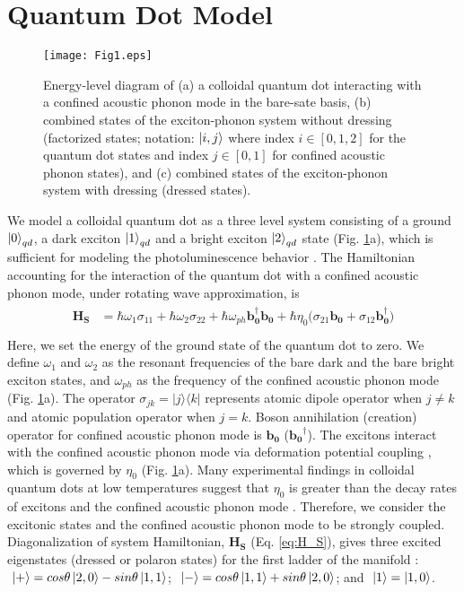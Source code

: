 \documentclass[aps,pra,preprint,groupedaddress]{revtex4-1}
\begin{document}
\section*{Quantum Dot Model}
\begin{figure}[htbp]
\centering\texttt{[image: Fig1.eps]}
\caption{Energy-level diagram of (a) a colloidal quantum dot interacting with a confined acoustic phonon mode in the bare-sate basis, (b) combined states of the exciton-phonon system without dressing (factorized states; notation: $\ket{i,j}$ where index $i \in [0,1,2]$ for the quantum dot states and index $j \in [0,1]$ for confined acoustic phonon states), and (c) combined states of the exciton-phonon system with dressing (dressed states).}
\label{Fig:BareQD_schematic}
\end{figure}
We model a colloidal quantum dot as a three level system consisting of a ground $\ket{0}_{qd}$, a dark exciton $\ket{1}_{qd}$ and a bright exciton $\ket{2}_{qd}$ state (Fig. \ref{Fig:BareQD_schematic}a), which is sufficient for modeling the photoluminescence behavior \cite{Klimov2007b}. The Hamiltonian accounting for the interaction of the quantum dot with a confined acoustic phonon mode, under rotating wave approximation, is
\begin{eqnarray}
\begin{aligned}
\label{eq:H_S}
\mathbf{H_{S}} &= \hbar\omega_{1}\sigma_{11}+ \hbar\omega_{2}\sigma_{22}+\hbar\omega_{ph}\mathbf{b_{0}^\dagger}\mathbf{b_{0}}+\hbar\eta_0(\sigma_{21}\mathbf{b_{0}}+\sigma_{12}\mathbf{b_{0}^\dagger)}\\
\end{aligned}
\end{eqnarray}
Here, we set the energy of the ground state of the quantum dot to zero. We define $\omega_{1}$ and $\omega_{2}$ as the resonant frequencies of the bare dark and the bare bright exciton states, and $\omega_{ph}$ as the frequency of the confined acoustic phonon mode (Fig. \ref{Fig:BareQD_schematic}a). The operator $\sigma_{jk} = |j\rangle\langle k|$ represents atomic dipole operator when $j \neq k$ and atomic population operator when $j = k$. Boson annihilation (creation) operator for confined acoustic phonon mode is $\mathbf{b_0}$ ($\mathbf{b_0}^\dagger$). The excitons interact with the confined acoustic phonon mode via deformation potential coupling \cite{Takagahara1996}, which is governed by $\eta_0$ (Fig. \ref{Fig:BareQD_schematic}a). Many experimental findings in colloidal quantum dots at low temperatures suggest that $\eta_0$ is greater than the decay rates of excitons and the confined acoustic phonon mode \cite{Krauss1997,Oron2009, Sagar2008, Califano2005, Labeau2003,Spann2013}. Therefore, we consider the excitonic states and the confined acoustic phonon mode to be strongly coupled. Diagonalization of system Hamiltonian, $\mathbf{H_S}$ (Eq. \ref{eq:H_S}), gives three excited eigenstates (dressed or polaron states) for the first ladder of the manifold \cite{Blais2004}: $\,\,\ket{+} = cos\theta\ket{2,0}-sin\theta\ket{1,1}$; $\,\,\ket{-} = cos\theta\ket{1,1}+sin\theta\ket{2,0}$; and $\,\,\ket{1} = \ket{1,0}$.
\end{document}
